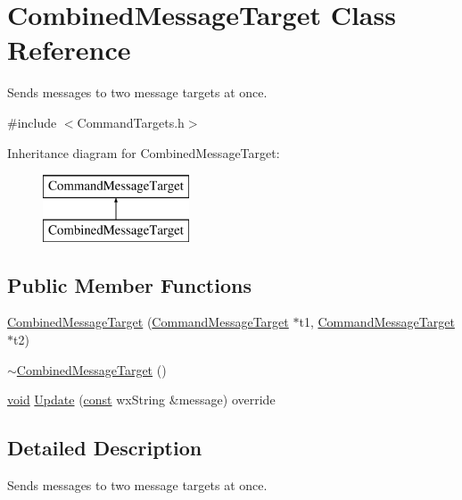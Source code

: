 \hypertarget{class_combined_message_target}{}\section{Combined\+Message\+Target Class Reference}
\label{class_combined_message_target}


Sends messages to two message targets at once.  




{\ttfamily \#include $<$Command\+Targets.\+h$>$}

Inheritance diagram for Combined\+Message\+Target\+:\begin{figure}[H]
\begin{center}
\leavevmode
\includegraphics[height=2.000000cm]{class_combined_message_target}
\end{center}
\end{figure}
\subsection*{Public Member Functions}
\begin{DoxyCompactItemize}
\item 
\hyperlink{class_combined_message_target_ac9046519aed07929dc6d8e5ecb5c5c05}{Combined\+Message\+Target} (\hyperlink{class_command_message_target}{Command\+Message\+Target} $\ast$t1, \hyperlink{class_command_message_target}{Command\+Message\+Target} $\ast$t2)
\item 
\hyperlink{class_combined_message_target_a4082463b2bc872f32d3b06c01e32f7c1}{$\sim$\+Combined\+Message\+Target} ()
\item 
\hyperlink{sound_8c_ae35f5844602719cf66324f4de2a658b3}{void} \hyperlink{class_combined_message_target_ae0571c1b6aa0fe84778c2bb2fd3964fe}{Update} (\hyperlink{getopt1_8c_a2c212835823e3c54a8ab6d95c652660e}{const} wx\+String \&message) override
\end{DoxyCompactItemize}


\subsection{Detailed Description}
Sends messages to two message targets at once. 

